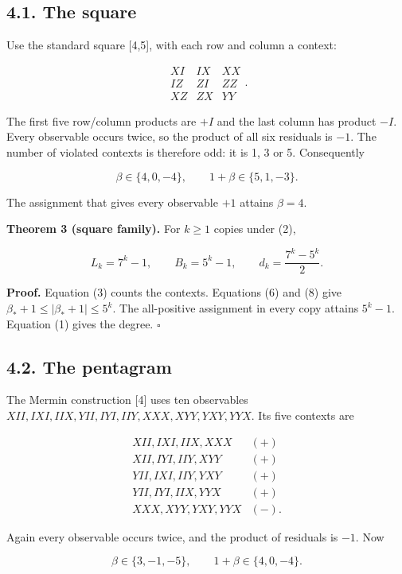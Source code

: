\documentclass[10pt,a4paper]{article}
\begin{document}
\subsection{4.1. The square}\label{the-square}

Use the standard square {[}4,5{]}, with each row and column a context:

\[\begin{array}{ccc}
XI&IX&XX\\
IZ&ZI&ZZ\\
XZ&ZX&YY
\end{array}.\]

The first five row/column products are \(+I\) and the last column has product \(-I\). Every observable occurs twice, so the product of all six residuals is \(-1\). The number of violated contexts is therefore odd: it is 1, 3 or 5. Consequently

\[\beta\in\{4,0,-4\},\qquad 1+\beta\in\{5,1,-3\}. \tag{8}\]

The assignment that gives every observable \(+1\) attains \(\beta=4\).

\textbf{Theorem 3 (square family).} For \(k\ge1\) copies under (2),

\[L_k=7^k-1,\qquad B_k=5^k-1,\qquad
d_k=\frac{7^k-5^k}{2}. \tag{9}\]

\textbf{Proof.} Equation (3) counts the contexts. Equations (6) and (8) give \(\beta_*+1\le|\beta_*+1|\le5^k\). The all-positive assignment in every copy attains \(5^k-1\). Equation (1) gives the degree. \(\square\)

\subsection{4.2. The pentagram}\label{the-pentagram}

The Mermin construction {[}4{]} uses ten observables \(XII,IXI,IIX,YII,IYI,IIY,XXX,XYY,YXY,YYX\). Its five contexts are

\[\begin{array}{ll}
XII,IXI,IIX,XXX &(+)\\
XII,IYI,IIY,XYY &(+)\\
YII,IXI,IIY,YXY &(+)\\
YII,IYI,IIX,YYX &(+)\\
XXX,XYY,YXY,YYX &(-).
\end{array}\]

Again every observable occurs twice, and the product of residuals is \(-1\). Now

\[\beta\in\{3,-1,-5\},\qquad 1+\beta\in\{4,0,-4\}. \tag{10}\]
\end{document}
